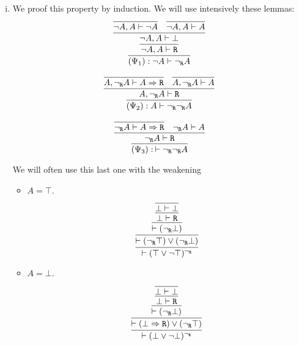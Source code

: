 \begin{enumerate}[(i)]
    \item We proof this property by induction.
    We will use intensively these lemmas:
    $$
    \infer{
        (\Psi_1) : \neg A \vdash \ngr A
    }{
        \infer{
            \neg A, A \vdash \R
        }{
            \infer{
                \neg A, A \vdash \bot
            }{
                \infer{
                    \neg A, A \vdash \neg A
                }{
                }&
                \infer{
                    \neg A, A \vdash A
                }{
                }
            }
        }
    }
    $$
    
    $$
    \infer{
        (\Psi_2) : A \vdash \ngr \ngr A
    }{
        \infer{
            A, \ngr A \vdash \R
        }{
            \infer{
                A, \ngr A \vdash A\Rightarrow \R
            }{
            }&
            \infer{
                A, \ngr A \vdash A
            }{
            }
        }
    }
    $$
    
    $$
    \infer{
        (\Psi_3) :\: \vdash \ngr \ngr A
    }{
        \infer{
             \ngr A \vdash \R
        }{
            \infer{
                 \ngr A \vdash A\Rightarrow \R
            }{
            }&
            \ngr A \vdash A
        }
    }
    $$
    
    We will often use this last one with the weakening
    
    \begin{itemize}
        \item $A = \top$.
            $$
            \infer{
                \vdash (\top \vee \neg \top)^\ngr
            }{
                \infer{
                    \vdash (\ngr \top) \vee (\ngr \bot)
                }{
                    \infer{
                        \vdash (\ngr \bot)
                    }{
                        \infer{
                            \bot \vdash \R
                        }{
                            \infer{
                                \bot \vdash \bot
                            }{
                            }
                        }
                    }
                }
            }
            $$
        \item $A = \bot$.
            $$
            \infer{
                \vdash (\bot \vee \neg \bot)^\ngr
            }{
                \infer{
                    \vdash (\bot \Rightarrow \R) \vee (\ngr \top)
                }{
                    \infer{
                        \vdash (\ngr \bot)
                    }{
                        \infer{
                            \bot \vdash \R
                        }{
                            \infer{\bot \vdash \bot}{}
                        }
                    }
                }
            }
            $$


\end{itemize}
\end{enumerate}
